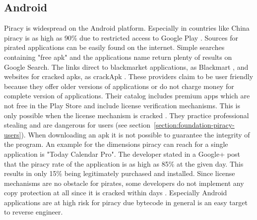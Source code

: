 \subsection{Android} \label{subsection:foundation-piracy-android}
Piracy is widespread on the Android platform. Especially in countries like China piracy is as high as 90\% due to restricted access to Google Play \cite{piracyRate}.
Sources for pirated applications can be easily found on the internet.
Simple searches containing "free apk" and the applications name return plenty of results on Google Search.
The links direct to blackmarket applications, as Blackmart \cite{blackmartStore}, and websites for cracked \gls{apk}s, as crackApk \cite{crackApk}.
These providers claim to be user friendly because they offer older versions of applications or do not charge money for complete version of applications.
Their catalog includes premium apps which are not free in the Play Store and include license verification mechanisms.
This is only possible when the license mechanism is cracked \cite{apksfree}.
They practice professional stealing and are dangerous for users (see section~\ref{section:foundation-piracy-users}).
When downloading an \gls{apk} it is not possible to guarantee the integrity of the program.
\newline
An example for the dimensions piracy can reach for a single application is "Today Calendar Pro".
The developer stated in a Google+ post that the piracy rate of the application is as high as 85\% at the given day.
This results in only 15\% being legitimately purchased and installed. \cite{xdaPiracy}\cite{developersPiracy}
\newline
Since license mechanisms are no obstacle for pirates, some developers do not implement any copy protection at all since it is cracked within days \cite{recodeMonument}.
Especially Android applications are at high risk for piracy due bytecode in general is an easy target to reverse engineer.


%




%


